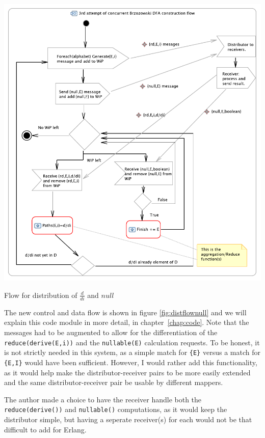\documentclass[a4paper,11pt]{report}
\begin{document}
\begin{Figure}[htb] %
	 \centering
	 \includegraphics[scale=1]{Activity-3null.pdf} 
	 \caption{Flow for distribution of $\frac{d}{di}$ and $null$}
	 \label{fig:distflownull}
\end{Figure}

The new control and data flow is shown in figure
\autoref{fig:distflownull} and we will explain this code module in more
detail, in chapter~\autoref{chap:code}. Note that the messages had to be
augmented to allow for the differentiation of the \sloppy
\texttt{reduce(derive(E,i))} and the \texttt{nullable(E)} calculation
requests. To be honest, it is not strictly needed in this system, as a
simple match for \texttt{\{E\}} versus a match for \texttt{\{E,I\}}
would have been sufficient.  However, I would rather add this
functionality, as it would help make the distributor-receiver pairs to
be more easily extended and the same distributor-receiver pair be
usable by different mappers.


The author made a choice to have the receiver handle both the
\texttt{reduce(derive())} and \texttt{nullable()} computations, as it
would keep the distributor simple, but having a seperate receiver(s) for
each would not be that difficult to add for Erlang.
\end{document}
